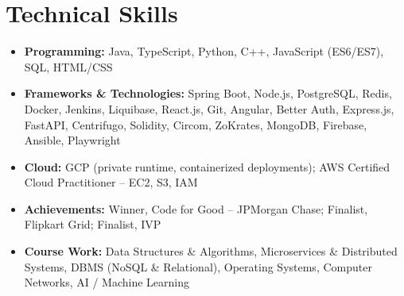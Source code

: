 \documentclass[a4paper,11pt]{article}
\newcommand{\resumeItem}[2]{
  \item{\textbf{#1}{\hspace{0.5mm}#2 \vspace{-0.5mm}}}
}
\newcommand{\resumeSubItem}[2]{\resumeItem{#1}{#2}\vspace{-7pt}}
\newcommand{\resumeHeadingSkillStart}{\begin{itemize}[leftmargin=*,itemsep=0.6mm, rightmargin=2ex]}
\newcommand{\resumeHeadingSkillEnd}{\end{itemize}\vspace{-2mm}}
\begin{document}
\section{\textbf{Technical Skills}}
\vspace{-0.4mm}
\resumeHeadingSkillStart
  \resumeSubItem{Programming: }
    {Java, TypeScript, Python, C++, JavaScript (ES6/ES7), SQL, HTML/CSS}
  \resumeSubItem{Frameworks \& Technologies: }
    {Spring Boot, Node.js, PostgreSQL, Redis, Docker, Jenkins, Liquibase, React.js, Git, Angular, Better Auth, Express.js, FastAPI, Centrifugo, Solidity, Circom, ZoKrates, MongoDB, Firebase, Ansible, Playwright}
  \resumeSubItem{Cloud: }
  {GCP (private runtime, containerized deployments); AWS Certified Cloud Practitioner -- EC2, S3, IAM}
  \resumeSubItem{Achievements: }
    {Winner, Code for Good -- JPMorgan Chase; Finalist, Flipkart Grid; Finalist, IVP}
  \resumeSubItem{Course Work: }
    {Data Structures \& Algorithms, Microservices \& Distributed Systems, DBMS (NoSQL \& Relational), Operating Systems, Computer Networks, AI / Machine Learning}
\resumeHeadingSkillEnd
\end{document}

